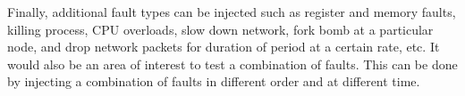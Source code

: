 Finally, additional fault types can be injected such as register and memory faults, killing process, CPU overloads,  slow down network, fork bomb at a particular node, and drop network packets for duration of period at a certain rate, etc. %
It would also be an area of interest to test a combination of faults. This can be done by injecting a combination of faults in different order and at different time. %



%
%

